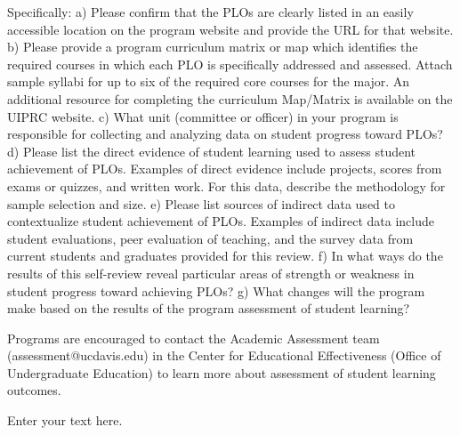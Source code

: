 \documentclass[12pt]{article}
\begin{document}
Specifically:
    a) Please confirm that the PLOs are clearly listed in an easily accessible location on the program website and provide the URL for that website.
    b) Please provide a program curriculum matrix or map which identifies the required courses in which each PLO is specifically addressed and assessed. Attach sample syllabi for up to six of the required core courses for the major. An additional resource for completing the curriculum Map/Matrix is available on the UIPRC website.
    c) What unit (committee or officer) in your program is responsible for collecting and analyzing data on student progress toward PLOs?
    d) Please list the direct evidence of student learning used to assess student achievement of PLOs. Examples of direct evidence include projects, scores from exams or quizzes, and written work. For this data, describe the methodology for sample selection and size.  
    e) Please list sources of indirect data used to contextualize student achievement of PLOs. Examples of indirect data include student evaluations, peer evaluation of teaching, and the survey data from current students and graduates provided for this review.
    f) In what ways do the results of this self-review reveal particular areas of strength or weakness in student progress toward achieving PLOs?
    g) What changes will the program make based on the results of the program assessment of student learning?

Programs are encouraged to contact the Academic Assessment team (assessment@ucdavis.edu) in the Center for Educational Effectiveness (Office of Undergraduate Education) to learn more about assessment of student learning outcomes.

Enter your text here.
\end{document}
